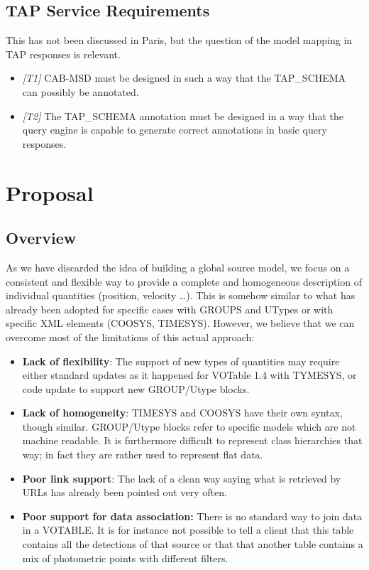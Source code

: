 \documentclass[11pt,a4paper]{ivoa}
\begin{document}
\subsection{TAP Service Requirements}
This has not been discussed in Paris, but the question of the model mapping in TAP responses is relevant.
\begin{itemize}
    \item \textit{[T1]} CAB-MSD must be designed in such a way that the TAP\_SCHEMA can possibly be annotated.
    \item \textit{[T2]} The TAP\_SCHEMA annotation must be designed in a way that the query engine is capable to generate correct annotations in basic query responses.
\end{itemize}

\section{Proposal}
\subsection{Overview}
As we have discarded the idea of building a global source model, we focus on a consistent and flexible way to provide a complete and homogeneous description of individual quantities (position, velocity \dots). 
This is somehow similar to what has already been adopted for specific cases with GROUPS and UTypes or with specific XML elements (COOSYS, TIMESYS). However, we believe that we can overcome most of the limitations of this actual approach:
\begin{itemize}
\item \textbf{Lack of flexibility}: The support of new types of quantities may require either standard updates as it happened for VOTable 1.4 with TYMESYS, or code update to support new GROUP/Utype blocks.
\item \textbf{Lack of homogeneity}: TIMESYS and COOSYS have their own syntax, though similar.  GROUP/Utype blocks refer to specific models which are not machine readable. It is furthermore difficult to represent class hierarchies that way; in fact they are rather used to represent flat data.
\item \textbf{Poor link support}: The lack of a clean way saying what is retrieved by URLs has already been pointed out very often.
\item \textbf{Poor support for data association: }There is no standard way to join data in a VOTABLE. It is for instance not possible to tell a client that this table contains all the detections of that source or that that another table contains a mix of photometric points with different filters.
\end{itemize}
\end{document}
